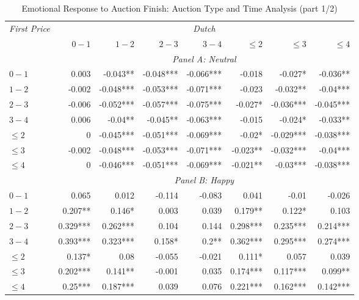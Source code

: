 \documentclass[]{article}
\begin{document}
\begin{table}[!htb] 

\caption{Emotional Response to Auction Finish: Auction Type and Time Analysis (part 1/2)} 

\label{tab:emotionalResponse2} 

\centering 

\begingroup 

\scriptsize 

\begin{tabular}{lrrrrrrr} 

\toprule
\emph{First Price} & \multicolumn{7}{c}{\emph{Dutch}} \\ 

\cmidrule(lr){2-8} 
 & $0-1$ & $1-2$ & $2-3$ & $3-4$ & $\leq 2$ & $\leq 3$ & $\leq 4$ \\ 

\cmidrule(lr){2-8} 

& \multicolumn{7}{c}{\emph{Panel A: Neutral}}\\ 

\cmidrule(lr){1-1} \cmidrule(lr){2-8}
$0-1$ & 0.003     & -0.043**  & -0.048*** & -0.066*** & -0.018    & -0.027*   & -0.036**  \\ 
  $1-2$ & -0.002    & -0.048*** & -0.053*** & -0.071*** & -0.023    & -0.032**  & -0.04***  \\ 
  $2-3$ & -0.006    & -0.052*** & -0.057*** & -0.075*** & -0.027*   & -0.036*** & -0.045*** \\ 
  $3-4$ & 0.006     & -0.04**   & -0.045**  & -0.063*** & -0.015    & -0.024*   & -0.033**  \\ 
$\leq 2$ & 0         & -0.045*** & -0.051*** & -0.069*** & -0.02*    & -0.029*** & -0.038*** \\ 
$\leq 3$ & -0.002    & -0.048*** & -0.053*** & -0.071*** & -0.023**  & -0.032*** & -0.04***  \\ 
$\leq 4$ & 0         & -0.046*** & -0.051*** & -0.069*** & -0.021**  & -0.03***  & -0.038*** \\ 
\cmidrule(lr){2-8} 

& \multicolumn{7}{c}{\emph{Panel B: Happy}}\\ 

\cmidrule(lr){1-1} \cmidrule(lr){2-8}
$0-1$ & 0.065     & 0.012     & -0.114    & -0.083    & 0.041     & -0.01     & -0.026    \\ 
  $1-2$ & 0.207**   & 0.146*    & 0.003     & 0.039     & 0.179**   & 0.122*    & 0.103     \\ 
  $2-3$ & 0.329***  & 0.262***  & 0.104     & 0.144     & 0.298***  & 0.235***  & 0.214***  \\ 
  $3-4$ & 0.393***  & 0.323***  & 0.158*    & 0.2**     & 0.362***  & 0.295***  & 0.274***  \\ 
$\leq 2$ & 0.137*    & 0.08      & -0.055    & -0.021    & 0.111*    & 0.057     & 0.039     \\ 
$\leq 3$ & 0.202***  & 0.141**   & -0.001    & 0.035     & 0.174***  & 0.117***  & 0.099**   \\ 
$\leq 4$ & 0.25***   & 0.187***  & 0.039     & 0.076     & 0.221***  & 0.162***  & 0.142***  \\ 
\cmidrule(lr){2-8} 


\end{tabular}
\end{table}
\end{document}
